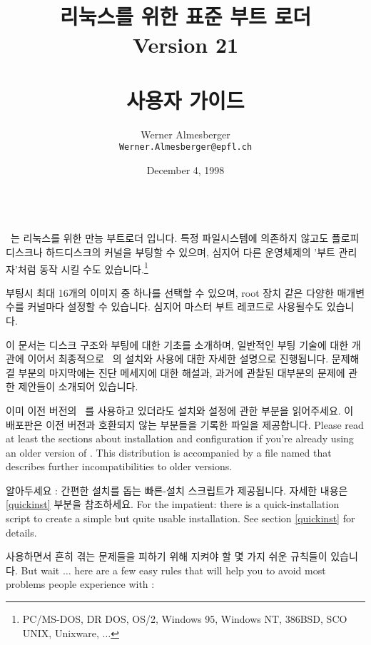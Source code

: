 \title{\LILO \\
  \Large
  리눅스를 위한 표준 부트 로더 \\
  Version 21 \\ ~\\
  \bf 사용자 가이드}
\author{Werner Almesberger \\
  {\tt Werner.Almesberger@epfl.ch}}
\date{December 4, 1998}

\maketitle
{
  \parskip=-1pt
  \setcounter{tocdepth}{2}
  \tableofcontents
}

~\\
\LILO\ 는 리눅스를 위한 만능 부트로더 입니다. 특정 파일시스템에 의존하지 않고도 플로피 디스크나 하드디스크의 커널을 부팅할 수 있으며, 심지어 다른 운영체제의 '부트 관리자'처럼 동작 시킬 수도 있습니다.\footnote{PC/MS-DOS, DR DOS, OS/2, Windows 95, Windows NT, 386BSD, SCO UNIX, Unixware, $\ldots$}

부팅시 최대 16개의 이미지 중 하나를 선택할 수 있으며, 
root 장치 같은 다양한 매개변수를 커널마다 설정할 수 있습니다.
\LILO\는 심지어 마스터 부트 레코드로 사용될수도 있습니다.

이 문서는 디스크 구조와 부팅에 대한 기초를 소개하며,
일반적인 부팅 기술에 대한 개관에 이어서 최종적으로 \LILO\ 의 설치와 사용에 대한 자세한 설명으로 진행됩니다. 문제해결 부분의 마지막에는 진단 메세지에 대한 해설과, 과거에 관찰된 대부분의 문제에 관한 제안들이 소개되어 있습니다.

이미 이전 버전의 \LILO\ 를 사용하고 있더라도 설치와 설정에 관한 부분을 읽어주세요.
이 배포판은 이전 버전과 호환되지 않는 부분들을 기록한  파일을 제공합니다. 
Please read at least the sections about installation and configuration if
you're already using an older version of \LILO. This distribution is
accompanied by a file named  that describes further
incompatibilities to older versions.

알아두세요 : 간편한 설치를 돕는 빠른-설치 스크립트가 제공됩니다. 자세한 내용은 \ref{quickinst} 부분을 참조하세요.
For the impatient: there is a quick-installation script to create
a simple but quite usable installation. See section \ref{quickinst} for
details.

 사용하면서 흔히 겪는 문제들을 피하기 위해 지켜야 할 몇 가지 쉬운 규칙들이 있습니다.
But wait $\ldots$ here are a few easy rules that will help you to avoid
most problems people experience with \LILO:

